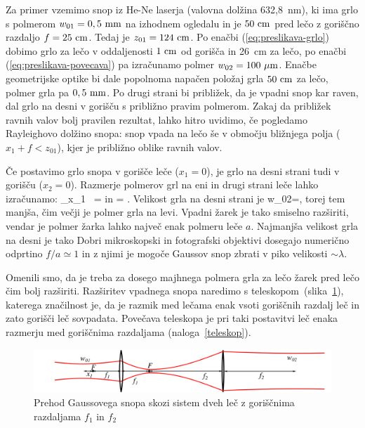 Za primer vzemimo snop iz He-Ne laserja (valovna dolžina 632,8~nm), ki ima grlo s 
polmerom $w_{01}=0,5~\milli\metre$ na izhodnem ogledalu in je $50~\centi\metre$ pred lečo z 
goriščno razdaljo $f=25~\centi\metre$.
Tedaj je $z_{01}=124~\centi\metre$. Po enačbi (\ref{eq:preslikava-grlo})
dobimo grlo za lečo v oddaljenosti $1~\centi\metre$ od gorišča in 26~cm za lečo, 
po enačbi (\ref{eq:preslikava-povecava})
pa izračunamo polmer $w_{02}=100~\micro\metre$. Enačbe geometrijske optike bi
dale popolnoma napačen položaj grla $50~\centi\metre$ za lečo, polmer grla pa 
$0,5~\milli\metre$. Po drugi strani bi približek, da je vpadni
snop kar raven, dal grlo na desni v gorišču s približno pravim polmerom. Zakaj da približek ravnih 
valov bolj pravilen rezultat, lahko hitro uvidimo, če pogledamo
Rayleighovo dolžino snopa: snop vpada na lečo še v območju bližnjega polja ($x_1 + f < z_{01}$), kjer 
je približno oblike ravnih valov. 


Če postavimo grlo snopa v gorišče leče ($x_{1}=0$), je grlo na
desni strani tudi v gorišču ($x_{2}=0$). Razmerje polmerov grl
na eni in drugi strani leče lahko izračunamo:
\beq
\lim_{x_1 }~= \qquad \textrm{in} \qquad
{}= .
\eeq
Velikost grla na desni strani je 
\beq
w_{02}=,
\eeq
torej tem manjša, čim večji je polmer grla na levi. Vpadni žarek je tako smiselno
razširiti, vendar je polmer žarka lahko največ enak polmeru leče $a$. 
Najmanjša velikost grla na desni je tako 
Dobri mikroskopski in fotografski
objektivi dosegajo numerično odprtino $f/a\simeq1$ in z njimi je mogoče Gaussov snop
zbrati v piko velikosti $\sim\lambda$. 


Omenili smo, da je treba za dosego majhnega polmera grla za lečo žarek pred lečo čim bolj razširiti.
Razširitev vpadnega snopa naredimo s teleskopom~(slika~\ref{fig:Prehod-Gaussovega-snopa-teleskop}),
katerega značilnost je, da je razmik med lečama enak vsoti goriščnih razdalj leč in zato gorišči
leč sovpadata. Povečava teleskopa je pri taki postavitvi leč enaka razmerju med goriščnima razdaljama (naloga~\ref{teleskop}).

\begin{figure}[h]
\includegraphics[width=15truecm]{slike/03_teleskop.png}
\caption{Prehod Gaussovega snopa
skozi sistem dveh leč z goriščnima razdaljama $f_{1}$ in $f_{2}$}
\label{fig:Prehod-Gaussovega-snopa-teleskop}
\end{figure}

